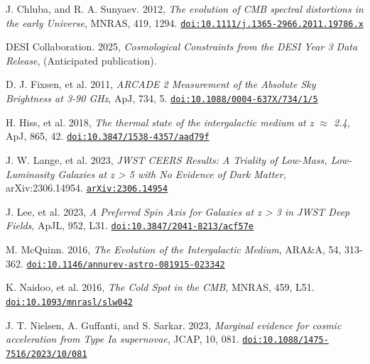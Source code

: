 \documentclass{BSpacePaper} %
\begin{document}

\begin{thebibliography}{99}

J. Chluba, and R. A. Sunyaev. 2012, \textit{The evolution of CMB spectral distortions in the early Universe}, MNRAS, 419, 1294. \href{https://doi.org/10.1111/j.1365-2966.2011.19786.x}{\nolinkurl{doi:10.1111/j.1365-2966.2011.19786.x}}

DESI Collaboration. 2025, \textit{Cosmological Constraints from the DESI Year 3 Data Release}, (Anticipated publication).

D. J. Fixsen, et al. 2011, \textit{ARCADE 2 Measurement of the Absolute Sky Brightness at 3-90 GHz}, ApJ, 734, 5. \href{https://doi.org/10.1088/0004-637X/734/1/5}{\nolinkurl{doi:10.1088/0004-637X/734/1/5}}

H. Hiss, et al. 2018, \textit{The thermal state of the intergalactic medium at z \(\approx\) 2.4}, ApJ, 865, 42. \href{https://doi.org/10.3847/1538-4357/aad79f}{\nolinkurl{doi:10.3847/1538-4357/aad79f}}

J. W. Lange, et al. 2023, \textit{JWST CEERS Results: A Triality of Low-Mass, Low-Luminosity Galaxies at z > 5 with No Evidence of Dark Matter}, arXiv:2306.14954. \href{https://arxiv.org/abs/2306.14954}{\nolinkurl{arXiv:2306.14954}}

J. Lee, et al. 2023, \textit{A Preferred Spin Axis for Galaxies at z > 3 in JWST Deep Fields}, ApJL, 952, L31. \href{https://doi.org/10.3847/2041-8213/acf57e}{\nolinkurl{doi:10.3847/2041-8213/acf57e}}

M. McQuinn. 2016, \textit{The Evolution of the Intergalactic Medium}, ARA\&A, 54, 313-362. \href{https://doi.org/10.1146/annurev-astro-081915-023342}{\nolinkurl{doi:10.1146/annurev-astro-081915-023342}}

K. Naidoo, et al. 2016, \textit{The Cold Spot in the CMB}, MNRAS, 459, L51. \href{https://doi.org/10.1093/mnrasl/slw042}{\nolinkurl{doi:10.1093/mnrasl/slw042}}

J. T. Nielsen, A. Guffanti, and S. Sarkar. 2023, \textit{Marginal evidence for cosmic acceleration from Type Ia supernovae}, JCAP, 10, 081. \href{https://doi.org/10.1088/1475-7516/2023/10/081}{\nolinkurl{doi:10.1088/1475-7516/2023/10/081}}


\end{thebibliography}
\end{document}
